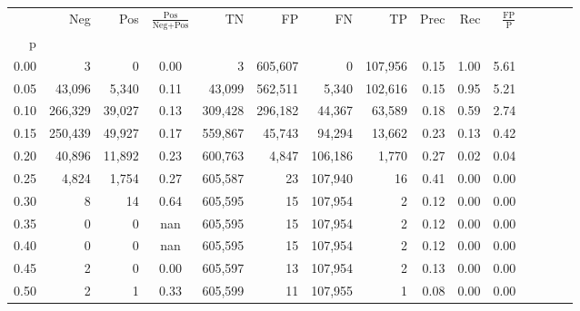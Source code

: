 \begin{tabular}{rrrcrrrrrrrrrrr}
\toprule
{} &      Neg &     Pos & $\frac{\text{Pos}}{\text{Neg}+\text{Pos}}$ &       TN &       FP &       FN &       TP &  Prec &   Rec & $\frac{\text{FP}}{\text{P}}$ \\
p    &          &         &                                            &          &          &          &          &       &       &                              \\
\midrule
0.00 &        3 &       0 &                                       0.00 &        3 &  605,607 &        0 &  107,956 &  0.15 &  1.00 &                         5.61 \\
0.05 &   43,096 &   5,340 &                                       0.11 &   43,099 &  562,511 &    5,340 &  102,616 &  0.15 &  0.95 &                         5.21 \\
0.10 &  266,329 &  39,027 &                                       0.13 &  309,428 &  296,182 &   44,367 &   63,589 &  0.18 &  0.59 &                         2.74 \\
0.15 &  250,439 &  49,927 &                                       0.17 &  559,867 &   45,743 &   94,294 &   13,662 &  0.23 &  0.13 &                         0.42 \\
0.20 &   40,896 &  11,892 &                                       0.23 &  600,763 &    4,847 &  106,186 &    1,770 &  0.27 &  0.02 &                         0.04 \\
0.25 &    4,824 &   1,754 &                                       0.27 &  605,587 &       23 &  107,940 &       16 &  0.41 &  0.00 &                         0.00 \\
0.30 &        8 &      14 &                                       0.64 &  605,595 &       15 &  107,954 &        2 &  0.12 &  0.00 &                         0.00 \\
0.35 &        0 &       0 &                                        nan &  605,595 &       15 &  107,954 &        2 &  0.12 &  0.00 &                         0.00 \\
0.40 &        0 &       0 &                                        nan &  605,595 &       15 &  107,954 &        2 &  0.12 &  0.00 &                         0.00 \\
0.45 &        2 &       0 &                                       0.00 &  605,597 &       13 &  107,954 &        2 &  0.13 &  0.00 &                         0.00 \\
0.50 &        2 &       1 &                                       0.33 &  605,599 &       11 &  107,955 &        1 &  0.08 &  0.00 &                         0.00 \\

\end{tabular}
